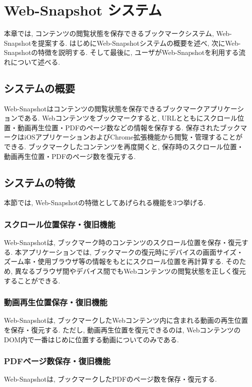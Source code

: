 \chapter{Web-Snapshot システム}
\label{chap:web_snapshot_system}
本章では, コンテンツの閲覧状態を保存できるブックマークシステム, Web-Snapshotを提案する.
はじめにWeb-Snapshotシステムの概要を述べ, 次にWeb-Snapshotの特徴を説明する.
そして最後に, ユーザがWeb-Snapshotを利用する流れについて述べる.

\section{システムの概要}
Web-Snapshotはコンテンツの閲覧状態を保存できるブックマークアプリケーションである.
Webコンテンツをブックマークすると, URLとともにスクロール位置・動画再生位置・PDFのページ数などの情報を保存する.
保存されたブックマークはiOSアプリケーションおよびChrome拡張機能から閲覧・管理することができる.
ブックマークしたコンテンツを再度開くと, 保存時のスクロール位置・動画再生位置・PDFのページ数を復元する.

\section{システムの特徴}
本節では, Web-Snapshotの特徴としてあげられる機能を3つ挙げる.

\subsection{スクロール位置保存・復旧機能}
Web-Snapshotは, ブックマーク時のコンテンツのスクロール位置を保存・復元する.
本アプリケーションでは, ブックマークの復元時にデバイスの画面サイズ・ズーム率・使用ブラウザ等の情報をもとにスクロール位置を再計算する.
そのため, 異なるブラウザ間やデバイス間でもWebコンテンツの閲覧状態を正しく復元することができる.

\subsection{動画再生位置保存・復旧機能}
Web-Snapshotは, ブックマークしたWebコンテンツ内に含まれる動画の再生位置を保存・復元する.
ただし, 動画再生位置を復元できるのは, WebコンテンツのDOM内で一番はじめに位置する動画についてのみである.

\subsection{PDFページ数保存・復旧機能}
Web-Snapshotは, ブックマークしたPDFのページ数を保存・復元する.

